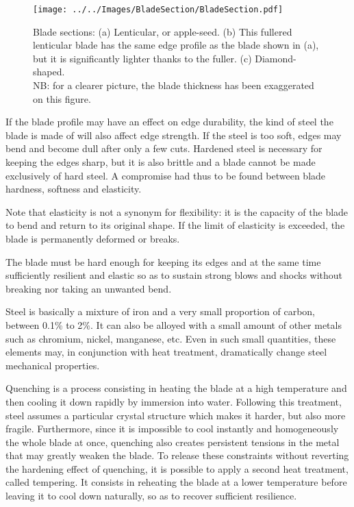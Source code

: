 \begin{figure}[ht]
\centering
	\texttt{[image: ../../Images/BladeSection/BladeSection.pdf]}
	\caption[Blade section]{Blade sections: (a) Lenticular, or apple-seed. (b) This fullered lenticular blade has the same edge profile as the blade shown in (a), but it is significantly lighter thanks to the fuller. (c) Diamond-shaped.\\
	NB: for a clearer picture, the blade thickness has been exaggerated on this figure.}
	\label{fig:blade_section}
\end{figure}

If the blade profile may have an effect on edge durability, the kind of steel the blade is made of will also affect edge strength.  
If the steel is too soft, edges may bend and become dull after only a few cuts. Hardened steel is necessary for keeping the edges sharp, but it is also brittle and a blade cannot be made exclusively of hard steel. 
A compromise had thus to be found between blade hardness, softness and elasticity.

Note that elasticity is not a synonym for flexibility: it is the capacity of the blade to bend and return to its original shape. If the limit of elasticity is exceeded, the blade is permanently deformed or breaks. 

The blade must be hard enough for keeping its edges and at the same time sufficiently resilient and elastic so as to sustain strong blows and shocks without breaking nor taking an unwanted bend.

Steel is basically a mixture of iron and a very small proportion of carbon, between 0.1\% to 2\%. It can also be alloyed with a small amount of other metals such as chromium, nickel, manganese, etc.
Even in such small quantities, these elements may, in conjunction with heat treatment, dramatically change steel mechanical properties.

Quenching is a process consisting in heating the blade at a high temperature and then cooling it down rapidly by immersion into water. 
Following this treatment, steel assumes a particular crystal structure which makes it harder, but also more fragile.
Furthermore, since it is impossible to cool instantly and homogeneously the whole blade at once, quenching also creates persistent tensions in the metal that may greatly weaken the blade.
To release these constraints without reverting the hardening effect of quenching, it is possible to apply a second heat treatment, called tempering. It consists in reheating the blade at a lower temperature before leaving it to cool down naturally, so as to recover sufficient resilience.

